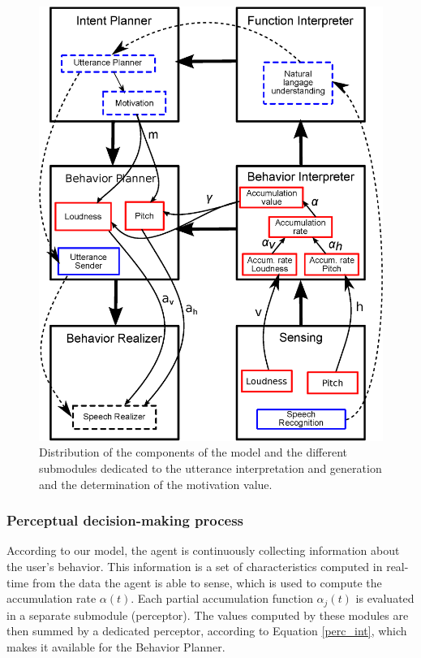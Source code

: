 \begin{figure}
  \centering
  \includegraphics[width=\linewidth]{figure/impl_equ_dial.eps}
  \caption{Distribution of the components of the model and the different submodules dedicated to the utterance interpretation and generation and the determination of the motivation value.}
  \label{impl_modules}
\end{figure}

\subsubsection{Perceptual decision-making process}

According to our model, the agent is continuously collecting information about the user's behavior. This information is a set of characteristics computed in real-time from the data the agent is able to sense, which is used to compute the accumulation rate $\alpha(t)$. 
Each partial accumulation function $\alpha_j(t)$ is evaluated in a separate submodule (perceptor). The values computed by these modules are then summed by a dedicated perceptor, according to Equation \ref{perc_int}, which makes it available for the Behavior Planner. 

